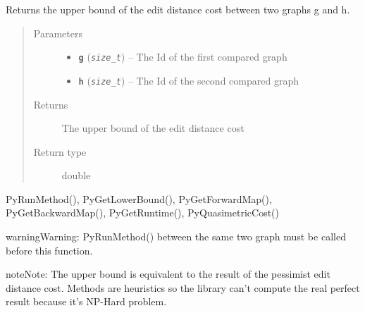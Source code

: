 \documentclass[letterpaper,10pt,english]{sphinxmanual}
\begin{document}
\begin{fulllineitems}
\label{doc:PythonGedLib.PyGetUpperBound}
Returns the upper bound of the edit distance cost between two graphs g and h.
\begin{quote}\begin{description}
\item[{Parameters}] \leavevmode\begin{itemize}
\item {} 
\textbf{\texttt{g}} (\emph{\texttt{size\_t}}) -- The Id of the first compared graph

\item {} 
\textbf{\texttt{h}} (\emph{\texttt{size\_t}}) -- The Id of the second compared graph

\end{itemize}

\item[{Returns}] \leavevmode
The upper bound of the edit distance cost

\item[{Return type}] \leavevmode
double

\end{description}\end{quote}




PyRunMethod(), PyGetLowerBound(), PyGetForwardMap(), PyGetBackwardMap(), PyGetRuntime(), PyQuasimetricCost()



\begin{notice}{warning}{Warning:}
PyRunMethod() between the same two graph must be called before this function.
\end{notice}

\begin{notice}{note}{Note:}
The upper bound is equivalent to the result of the pessimist edit distance cost. Methods are heuristics so the library can't compute the real perfect result because it's NP-Hard problem.
\end{notice}

\end{fulllineitems}

\end{document}
